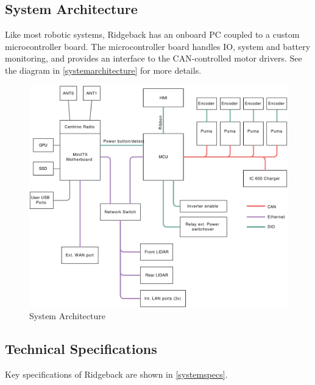 \documentclass[]{clearpath-latex/clearpath-manual}
\begin{document}
\subsection{System Architecture}

Like most robotic systems, Ridgeback has an onboard PC coupled to a custom microcontroller board. The microcontroller board handles IO, system and battery monitoring, and provides an interface to the CAN-controlled motor drivers. See the diagram in \autoref{systemarchitecture} for more details.

\begin{figure}[!htb]
  \centering
  \includegraphics[width=0.75\linewidth]{ridgeback-logic-conn.pdf}
  \caption{System Architecture}
  \label{systemarchitecture}
\end{figure}

\clearpage

\subsection{Technical Specifications}

Key specifications of Ridgeback are shown in \autoref{systemspecs}.
\end{document}
